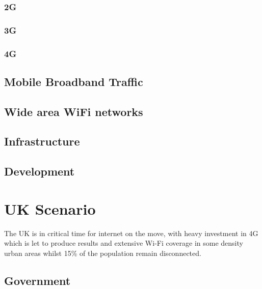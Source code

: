 \documentclass[journal]{IEEEtran}
\begin{document}
\subsubsection{2G}
\subsubsection{3G}
\subsubsection{4G}

\subsection{Mobile Broadband Traffic}
\subsection{Wide area WiFi networks}
\subsection{Infrastructure}

\subsection{Development}

\section{UK Scenario} %

The UK is in critical time for internet on the move, with heavy investment in 4G which is let to produce results and extensive Wi-Fi coverage in some density urban areas whilst 15\% of the population remain disconnected. \cite{accessOfcom}

\subsection{Government}
\end{document}
